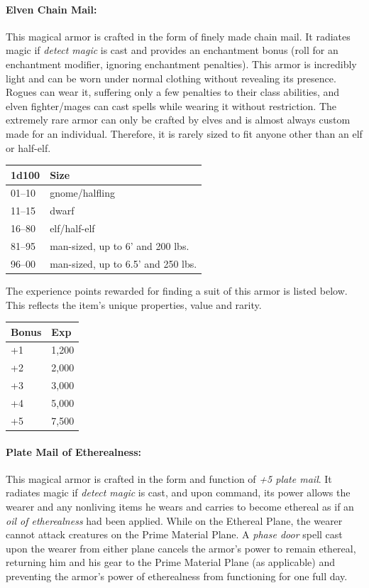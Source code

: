 \begin{multicols}{2}
\paragraph{Elven Chain Mail:} This magical armor is crafted in the form of finely made chain mail.  It radiates magic if \textit{detect magic} is cast and provides an enchantment bonus (roll for an enchantment modifier, ignoring enchantment penalties).  This armor is incredibly light and can be worn under normal clothing without revealing its presence.  Rogues can wear it, suffering only a few penalties to their class abilities, and elven fighter/mages can cast spells while wearing it without restriction.  The extremely rare armor can only be crafted by elves and is almost always custom made for an individual.  Therefore, it is rarely sized to fit anyone other than an elf or half-elf.

\noindent \begin{tabular}{|p{}|p{}|}
\hline
1d100	& Size \\
\hline\hline
\rowcolor[gray]{.9}01--10	& gnome/halfling \\
11--15	& dwarf \\
\rowcolor[gray]{.9}16--80	& elf/half-elf \\
81--95	& man-sized, up to 6' and 200 lbs. \\
\rowcolor[gray]{.9}96--00	& man-sized, up to 6.5' and 250 lbs. \\
\hline
\end{tabular}

The experience points rewarded for finding a suit of this armor is listed below.  This reflects the item's unique properties, value and rarity.
 
\noindent \begin{tabular}{|p{}|p{}|}
\hline
Bonus	& Exp \\
\hline\hline
\rowcolor[gray]{.9}+1	& 1,200 \\
+2	& 2,000 \\
\rowcolor[gray]{.9}+3	& 3,000 \\
+4	& 5,000 \\
\rowcolor[gray]{.9}+5	& 7,500 \\
\hline
\end{tabular}

\paragraph{Plate Mail of Etherealness:} This magical armor is crafted in the form and function of \textit{+5 plate mail}.  It radiates magic if \textit{detect magic} is cast, and upon command, its power allows the wearer and any nonliving items he wears and carries to become ethereal as if an \textit{oil of etherealness} had been applied.  While on the Ethereal Plane, the wearer cannot attack creatures on the Prime Material Plane.  A \textit{phase door} spell cast upon the wearer from either plane cancels the armor's power to remain ethereal, returning him and his gear to the Prime Material Plane (as applicable) and preventing the armor's power of etherealness from functioning for one full day.


\end{multicols}
